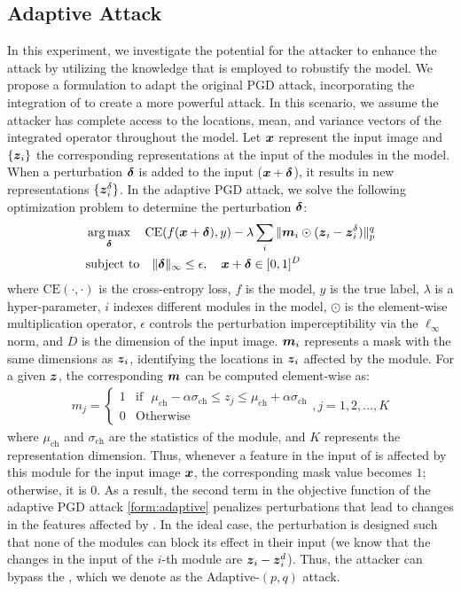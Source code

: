 \documentclass[conference]{IEEEtran}
\newcommand{\argmax}{\operatornamewithlimits{arg\,max}}
\begin{document}
\subsection{Adaptive Attack}\label{sec:adaptive}
In this experiment, we investigate the potential for the attacker to enhance the attack by utilizing the knowledge that \sys is employed to robustify the model. We propose a formulation to adapt the original PGD attack, incorporating the integration of \sys to create a more powerful attack. In this scenario, we assume the attacker has complete access to the locations, mean, and variance vectors of the integrated \sys operator throughout the model. Let $\boldsymbol{x}$ represent the input image and $\{\boldsymbol{z}_i\}$ the corresponding representations at the input of the \sys modules in the model. When a perturbation $\boldsymbol{\delta}$ is added to the input ($\boldsymbol{x} + \boldsymbol{\delta}$), it results in new representations $\{\boldsymbol{z}_i^\delta\}$. In the adaptive PGD attack, we solve the following optimization problem to determine the perturbation $\boldsymbol{\delta}$:
\begin{align}
    \nonumber&\argmax_{\deltab} \quad \mathrm{CE}(f(\xb + \deltab), y) - \lambda \sum_i \Vert \mbb_i \odot (\zb_i-\zb_i^\delta)\Vert_p^q\\
    &\text{subject to} \quad \|\deltab\|_\infty \leq \epsilon, \quad \xb + \deltab \in [0, 1]^D\label{form:adaptive}
\end{align}
where $\mathrm{CE}(\cdot, \cdot)$ is the cross-entropy loss, $f$ is the model, $y$ is the true label, $\lambda$ is a hyper-parameter, $i$ indexes different \sys modules in the model, $\odot$ is the element-wise multiplication operator, $\epsilon$ controls the perturbation imperceptibility via the $\ell_\infty$ norm, and $D$ is the dimension of the input image. $\boldsymbol{m}_i$ represents a mask with the same dimensions as $\boldsymbol{z}_i$, identifying the locations in $\boldsymbol{z}_i$ affected by the \sys module. For a given $\boldsymbol{z}$, the corresponding $\boldsymbol{m}$ can be computed element-wise as:
\begin{align*}
    m_j = 
    \begin{cases}
        1 & \text{if~~}\mu_{\mathrm{ch}} - \alpha\sigma_{\mathrm{ch}} \leq z_j \leq \mu_{\mathrm{ch}} + \alpha\sigma_{\mathrm{ch}}\\
        0 & \text{Otherwise}
    \end{cases}, j=1, 2, \ldots, K
\end{align*}
where $\mu_{\mathrm{ch}}$ and $\sigma_{\mathrm{ch}}$ are the statistics of the \sys module, and $K$ represents the representation dimension. Thus, whenever a feature in the input of \sys is affected by this module for the input image $\boldsymbol{x}$, the corresponding mask value becomes $1$; otherwise, it is $0$. As a result, the second term in the objective function of the adaptive PGD attack \mbox{\eqref{form:adaptive}} penalizes perturbations that lead to changes in the features affected by \sys. In the ideal case, the perturbation is designed such that none of the \sys modules can block its effect in their input (we know that the changes in the input of the $i$-th \sys module are $\boldsymbol{z}_i - \boldsymbol{z}_i^d$). Thus, the attacker can bypass the \sys, which we denote as the Adaptive-$(p, q)$ attack.
\end{document}
